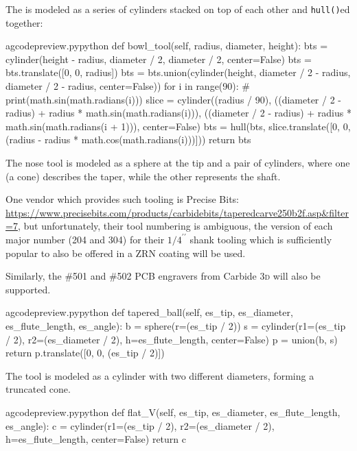 \documentclass{ltxdoc}
\begin{document}
The  is modeled as a series of cylinders stacked on top of each other and \verb|hull()|ed together:

\lstset{firstnumber=\thegcpy}
\begin{writecode}{a}{gcodepreview.py}{python}
    def bowl_tool(self, radius, diameter, height):
        bts = cylinder(height - radius, diameter / 2, diameter / 2, center=False)
        bts = bts.translate([0, 0, radius])
        bts = bts.union(cylinder(height, diameter / 2 - radius, diameter / 2 - radius, center=False))
        for i in range(90):
#            print(math.sin(math.radians(i)))
            slice = cylinder((radius / 90), ((diameter / 2 - radius) + radius * math.sin(math.radians(i))), ((diameter / 2 - radius) + radius * math.sin(math.radians(i + 1))), center=False)
            bts = hull(bts, slice.translate([0, 0, (radius - radius * math.cos(math.radians(i)))]))
        return bts

\end{writecode}
\addtocounter{gcpy}{10}

The  nose tool is modeled as a sphere at the tip and a pair of cylinders, where one (a cone) describes the taper, while the other represents the shaft.

One vendor which provides such tooling is Precise Bits: \url{https://www.precisebits.com/products/carbidebits/taperedcarve250b2f.asp&filter=7}, but unfortunately, their tool numbering is ambiguous, the version of each major number (204 and 304) for their $1/4^{\prime\prime}$ shank tooling which is sufficiently popular to also be offered in a ZRN coating will be used.

Similarly, the \#501 and \#502 PCB engravers from Carbide \textsc{3d} will also be supported.

\lstset{firstnumber=\thegcpy}
\begin{writecode}{a}{gcodepreview.py}{python}
    def tapered_ball(self, es_tip, es_diameter, es_flute_length, es_angle):
        b = sphere(r=(es_tip / 2))
        s = cylinder(r1=(es_tip / 2), r2=(es_diameter / 2), h=es_flute_length, center=False)
        p = union(b, s)
        return p.translate([0, 0, (es_tip / 2)])

\end{writecode}
\addtocounter{gcpy}{6}

The  tool is modeled as a cylinder with two different diameters, forming a truncated cone.

\lstset{firstnumber=\thegcpy}
\begin{writecode}{a}{gcodepreview.py}{python}
    def flat_V(self, es_tip, es_diameter, es_flute_length, es_angle):
        c = cylinder(r1=(es_tip / 2), r2=(es_diameter / 2), h=es_flute_length, center=False)
        return c

\end{writecode}
\addtocounter{gcpy}{6}
\end{document}
